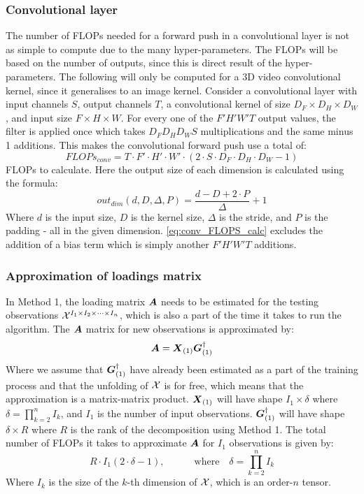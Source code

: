 \subsubsection{Convolutional layer}
The number of FLOPs needed for a forward push in a convolutional layer is not as simple to compute due to the many hyper-parameters. The FLOPs will be based on the number of outputs, since this is direct result of the hyper-parameters. The following will only be computed for a 3D video convolutional kernel, since it generalises to an image kernel. Consider a convolutional layer with input channels $S$, output channels $T$, a convolutional kernel of size $D_F\times D_H\times D_W$, and input size $F \times H\times W$. For every one of the $F' H' W' T$ output values, the filter is applied once which takes $D_F D_H D_W S$ multiplications and the same minus 1 additions. This makes the convolutional forward push use a total of:
\begin{equation}
    FLOPs_{conv} = T\cdot F'\cdot H'\cdot W'\cdot (2\cdot S \cdot D_F\cdot D_H\cdot D_W - 1)
    \label{eq:conv_FLOPS_calc}
\end{equation}
FLOPs to calculate. Here the output size of each dimension is calculated using the formula:
\begin{equation}
    out_{dim}(d, D, \Delta, P) = \frac{d - D + 2\cdot P}{\Delta} + 1
\end{equation}
Where $d$ is the input size, $D$ is the kernel size, $\Delta$ is the stride, and $P$ is the padding - all in the given dimension. \eqref{eq:conv_FLOPS_calc} excludes the addition of a bias term which is simply another $F' H' W' T$ additions.

\subsubsection{Approximation of loadings matrix}
In Method 1, the loading matrix $\boldsymbol{A}$ needs to be estimated for the testing observations $\mathcal{X}^{I_1 \times I_2 \times \dots \times I_n}$, which is also a part of the time it takes to run the algorithm. The $\boldsymbol{A}$ matrix for new observations is approximated by:
\begin{equation}
    \boldsymbol{A} = \boldsymbol{X}_{(1)} \boldsymbol{G}_{(1)}^{\dagger}
    \label{eq:estimation_of_loading_A}
\end{equation}
Where we assume that $\boldsymbol{G}_{(1)}^{\dagger}$ have already been estimated as a part of the training process and that the unfolding of $\mathcal{X}$ is for free, which means that the approximation is a matrix-matrix product. $\boldsymbol{X}_{(1)}$ will have shape $I_1 \times \delta$ where $\delta = \prod_{k=2}^n I_k$, and $I_1$ is the number of input observations. $\boldsymbol{G}_{(1)}^{\dagger}$ will have shape $\delta \times R$ where $R$ is the rank of the decomposition using Method 1. The total number of FLOPs it takes to approximate $\boldsymbol{A}$ for $I_1$ observations is given by:
\begin{equation}
    R \cdot I_1 (2\cdot \delta - 1), \qquad \quad \text{where} \quad \delta = \prod_{k=2}^n I_k
\end{equation}
Where $I_k$ is the size of the $k$-th dimension of $\mathcal{X}$, which is an order-$n$ tensor.